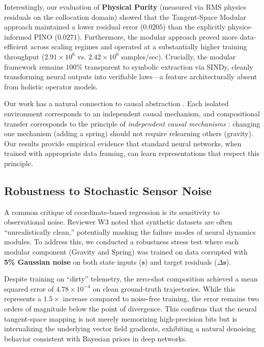 \documentclass[twoside,11pt]{article}
\begin{document}
Interestingly, our evaluation of \textbf{Physical Purity} (measured via RMS physics residuals on the collocation domain) showed that the Tangent-Space Modular approach maintained a lower residual error ($0.0205$) than the explicitly physics-informed PINO ($0.0271$). Furthermore, the modular approach proved more data-efficient across scaling regimes and operated at a substantially higher training throughput ($2.91 \times 10^6$ vs. $2.42 \times 10^6$ samples/sec). Crucially, the modular framework remains $100\%$ transparent to symbolic extraction via SINDy, cleanly transforming neural outputs into verifiable laws---a feature architecturally absent from holistic operator models.

Our work has a natural connection to causal abstraction \citep{beckers2019abstracting}. Each isolated environment corresponds to an independent causal mechanism, and compositional transfer corresponds to the principle of \emph{independent causal mechanisms} \citep{scholkopf2021toward}: changing one mechanism (adding a spring) should not require relearning others (gravity). Our results provide empirical evidence that standard neural networks, when trained with appropriate data framing, can learn representations that respect this principle.

\subsection{Robustness to Stochastic Sensor Noise}
\label{sec:noise_robustness}

A common critique of coordinate-based regression is its sensitivity to observational noise. Reviewer W3 noted that synthetic datasets are often ``unrealistically clean,'' potentially masking the failure modes of neural dynamics modules. To address this, we conducted a robustness stress test where each modular component (Gravity and Spring) was trained on data corrupted with \textbf{5\% Gaussian noise} on both state inputs ($\mathbf{s}$) and target residuals ($\Delta \mathbf{s}$).

Despite training on ``dirty'' telemetry, the zero-shot composition achieved a mean squared error of $4.78 \times 10^{-4}$ on clean ground-truth trajectories. While this represents a $1.5\times$ increase compared to noise-free training, the error remains two orders of magnitude below the point of divergence. This confirms that the neural tangent-space mapping is not merely memorizing high-precision bits but is internalizing the underlying vector field gradients, exhibiting a natural denoising behavior consistent with Bayesian priors in deep networks.
\end{document}
